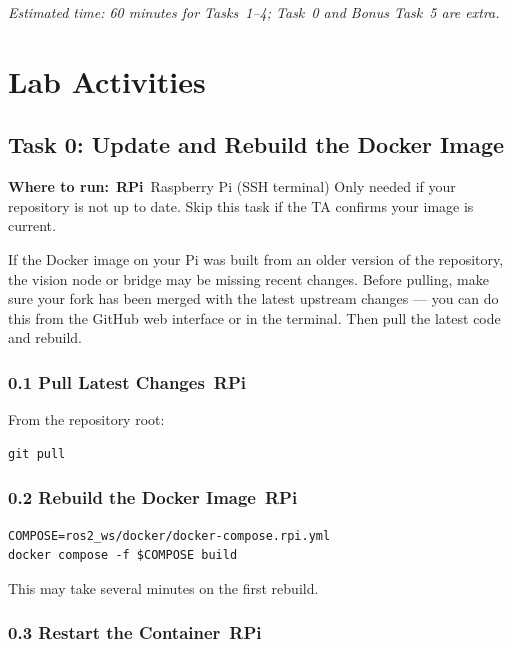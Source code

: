\documentclass{ol-softwaremanual}
\newcommand{\onrpi}{%
  \,\colorbox{blue!20}{\footnotesize\sffamily\bfseries RPi}}
\newcommand{\machinebox}[2]{%
  \par\noindent
  \colorbox{gray!12}{\parbox{\dimexpr\linewidth-2\fboxsep}{%
    \small\sffamily\textbf{Where to run:} #1 \quad\textbar\quad #2}}%
  \par\smallskip}
\begin{document}
\noindent\textit{Estimated time: 60 minutes for Tasks~1--4; Task~0 and Bonus Task~5 are extra.}


\section{Lab Activities}

\subsection{Task 0: Update and Rebuild the Docker Image}

\machinebox{\onrpi\ Raspberry Pi (SSH terminal)}{Only needed if your repository is not up to date. Skip this task if the TA confirms your image is current.}

If the Docker image on your Pi was built from an older version of the repository,
the vision node or bridge may be missing recent changes.
Before pulling, make sure your fork has been merged with the latest upstream
changes --- you can do this from the GitHub web interface or in the terminal.
Then pull the latest code and rebuild.

\subsubsection*{0.1 Pull Latest Changes\onrpi}

From the repository root:

\begin{verbatim}
git pull
\end{verbatim}

\subsubsection*{0.2 Rebuild the Docker Image\onrpi}

\begin{verbatim}
COMPOSE=ros2_ws/docker/docker-compose.rpi.yml
docker compose -f $COMPOSE build
\end{verbatim}

This may take several minutes on the first rebuild.

\subsubsection*{0.3 Restart the Container\onrpi}
\end{document}
